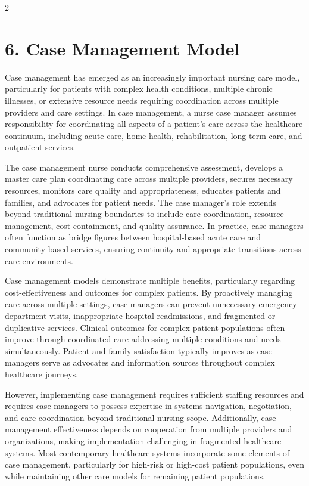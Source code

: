 \documentclass[12pt]{article}
\begin{document}
\begin{multicols}{2}
\section*{6. \quad Case Management Model}

Case management has emerged as an increasingly important nursing care model, particularly for patients with complex health conditions, multiple chronic illnesses, or extensive resource needs requiring coordination across multiple providers and care settings. In case management, a nurse case manager assumes responsibility for coordinating all aspects of a patient's care across the healthcare continuum, including acute care, home health, rehabilitation, long-term care, and outpatient services.

The case management nurse conducts comprehensive assessment, develops a master care plan coordinating care across multiple providers, secures necessary resources, monitors care quality and appropriateness, educates patients and families, and advocates for patient needs. The case manager's role extends beyond traditional nursing boundaries to include care coordination, resource management, cost containment, and quality assurance. In practice, case managers often function as bridge figures between hospital-based acute care and community-based services, ensuring continuity and appropriate transitions across care environments.

Case management models demonstrate multiple benefits, particularly regarding cost-effectiveness and outcomes for complex patients. By proactively managing care across multiple settings, case managers can prevent unnecessary emergency department visits, inappropriate hospital readmissions, and fragmented or duplicative services. Clinical outcomes for complex patient populations often improve through coordinated care addressing multiple conditions and needs simultaneously. Patient and family satisfaction typically improves as case managers serve as advocates and information sources throughout complex healthcare journeys.

However, implementing case management requires sufficient staffing resources and requires case managers to possess expertise in systems navigation, negotiation, and care coordination beyond traditional nursing scope. Additionally, case management effectiveness depends on cooperation from multiple providers and organizations, making implementation challenging in fragmented healthcare systems. Most contemporary healthcare systems incorporate some elements of case management, particularly for high-risk or high-cost patient populations, even while maintaining other care models for remaining patient populations.


\end{multicols}
\end{document}
